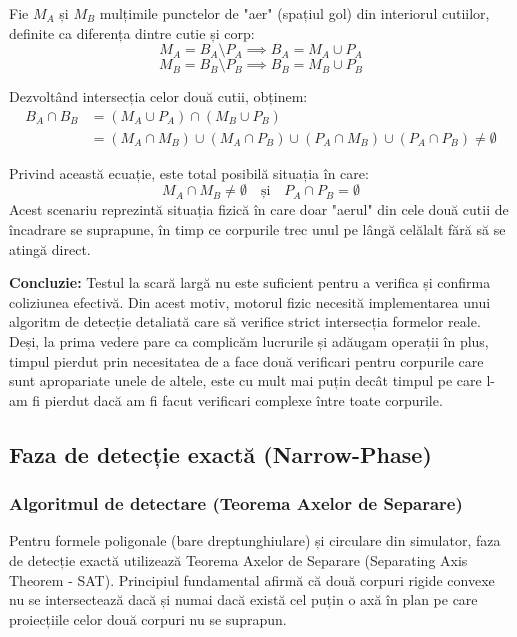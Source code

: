 \documentclass[12pt, a4paper]{article}
\begin{document}
Fie $M_A$ și $M_B$ mulțimile punctelor de "aer" (spațiul gol) din interiorul cutiilor, definite ca diferența dintre cutie și corp:
\begin{equation}
    M_A = B_A \setminus P_A \implies B_A = M_A \cup P_A
\end{equation}
\begin{equation}
    M_B = B_B \setminus P_B \implies B_B = M_B \cup P_B
\end{equation}

Dezvoltând intersecția celor două cutii, obținem:
\begin{align}
    B_A \cap B_B &= (M_A \cup P_A) \cap (M_B \cup P_B) \\
    &= (M_A \cap M_B) \cup (M_A \cap P_B) \cup (P_A \cap M_B) \cup (P_A \cap P_B) \neq \emptyset
\end{align}

Privind această ecuație, este total posibilă situația în care:
\begin{equation}
    M_A \cap M_B \neq \emptyset \quad \text{și} \quad P_A \cap P_B = \emptyset
\end{equation}
Acest scenariu reprezintă situația fizică în care doar "aerul" din cele două cutii de încadrare se suprapune, în timp ce corpurile trec unul pe lângă celălalt fără să se atingă direct.

\textbf{Concluzie:} Testul la scară largă nu este suficient pentru a verifica și confirma coliziunea efectivă. Din acest motiv, motorul fizic necesită implementarea unui algoritm de detecție detaliată care să verifice strict intersecția formelor reale. Deși, la prima vedere pare ca complicăm lucrurile și adăugam operații în plus, timpul pierdut prin necesitatea de a face două verificari pentru corpurile care sunt apropariate unele de altele, este cu mult mai puțin decât timpul pe care l-am fi pierdut dacă am fi facut verificari complexe între toate corpurile. 

\subsection{Faza de detecție exactă (Narrow-Phase)}

\subsubsection{Algoritmul de detectare (Teorema Axelor de Separare)}

Pentru formele poligonale (bare dreptunghiulare) și circulare din simulator, faza de detecție exactă utilizează Teorema Axelor de Separare (Separating Axis Theorem - SAT). Principiul fundamental afirmă că două corpuri rigide convexe nu se intersectează dacă și numai dacă există cel puțin o axă în plan pe care proiecțiile celor două corpuri nu se suprapun.
\end{document}
